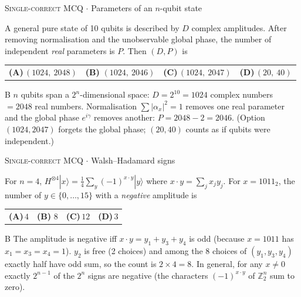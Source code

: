 \documentclass[11pt,a4paper]{article}
\newcommand{\optlabel}[1]{\textbf{(#1)}}
\newcommand{\correctlabel}[1]{\textcolor{okgreen}{\textbf{(#1)}\,\ding{51}}}
\newenvironment{qitem}[1]{\begin{list}{}{\setlength{\leftmargin}{3.3em}\setlength{\labelwidth}{3.1em}%
  \setlength{\labelsep}{0.2em}\setlength{\topsep}{3pt}\setlength{\parsep}{3pt}}\item[\textbf{Q.#1}\hfill]}{\end{list}}
\newcommand{\qsep}{\par\vspace{2pt}{\color{black!15}\hrule}\vspace{4pt}}
\newcommand{\qmeta}[2]{{\footnotesize\color{black!60}\textsc{#1} \;$\cdot$\; #2}\par}
\begin{document}
\begin{qitem}{9}
\qmeta{Single-correct MCQ}{Parameters of an $n$-qubit state}
A general pure state of 10 qubits is described by $D$ complex amplitudes. After removing normalisation and
the unobservable global phase, the number of independent \emph{real} parameters is $P$. Then $(D, P)$ is
\par\smallskip\noindent\begin{tabularx}{\linewidth}{@{}*{4}{L}@{}}
\optlabel{A}\,$(1024,\ 2048)$ & \correctlabel{B}\,$(1024,\ 2046)$ & \optlabel{C}\,$(1024,\ 2047)$ & \optlabel{D}\,$(20,\ 40)$
\end{tabularx}
\end{qitem}
\begin{solbox}{B}
$n$ qubits span a $2^n$-dimensional space: $D = 2^{10} = 1024$ complex numbers $= 2048$ real numbers.
Normalisation $\sum|\alpha_x|^2 = 1$ removes one real parameter and the global phase $e^{i\gamma}$ removes another:
$P = 2048 - 2 = 2046$. (Option $(1024, 2047)$ forgets the global phase; $(20, 40)$ counts as if qubits were independent.)
\end{solbox}
\qsep

\begin{qitem}{10}
\qmeta{Single-correct MCQ}{Walsh--Hadamard signs}
For $n = 4$, $H^{\otimes 4}|x\rangle = \frac14\sum_{y}(-1)^{x\cdot y}|y\rangle$ where $x\cdot y = \sum_j x_jy_j$.
For $x = 1011_2$, the number of $y \in \{0,\dots,15\}$ with a \emph{negative} amplitude is
\par\smallskip\noindent\begin{tabularx}{\linewidth}{@{}*{4}{L}@{}}
\optlabel{A}\,$4$ & \correctlabel{B}\,$8$ & \optlabel{C}\,$12$ & \optlabel{D}\,$3$
\end{tabularx}
\end{qitem}
\begin{solbox}{B}
The amplitude is negative iff $x\cdot y = y_1 + y_3 + y_4$ is odd (because $x = 1011$ has $x_1 = x_3 = x_4 = 1$).
$y_2$ is free (2 choices) and among the 8 choices of $(y_1, y_3, y_4)$ exactly half have odd sum, so the count is $2 \times 4 = 8$.
In general, for any $x \neq 0$ exactly $2^{n-1}$ of the $2^n$ signs are negative (the characters $(-1)^{x\cdot y}$ of
$\mathbb{Z}_2^n$ sum to zero).
\end{solbox}
\qsep
\end{document}
